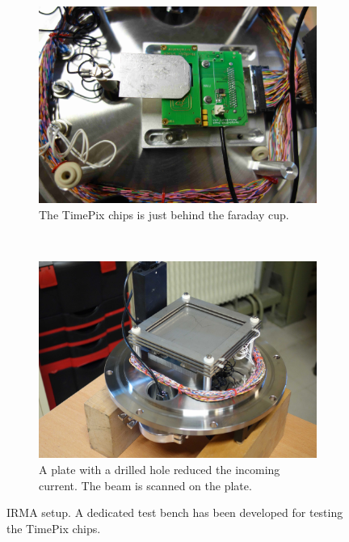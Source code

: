 \begin{figure}[!ht]
	\begin{subfigure}{0.5\textwidth}
		\includegraphics[width=\textwidth]{04_IPHI_Test/figures/fig000_IRMA_setup01.jpg}
		\caption{The TimePix chips is just behind the faraday cup.}
		\label{}
	\end{subfigure}
	~
	\begin{subfigure}{0.5\textwidth}
		\includegraphics[width=\textwidth]{04_IPHI_Test/figures/fig000_IRMA_setup02.jpg}
		\caption{A plate with a drilled hole reduced the incoming current. The beam is scanned on the plate.}
		\label{}
	\end{subfigure}
	\caption[IRMA setup]{IRMA setup. A dedicated test bench has been developed for testing the TimePix chips.}
	\label{chap4:IRMA_setup}
\end{figure}
